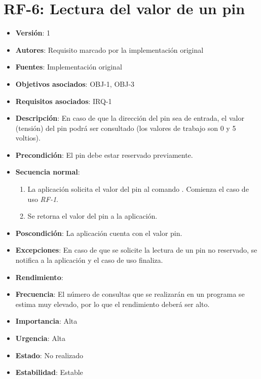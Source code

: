 \documentclass[letterpaper,10pt,spanish]{sphinxmanual}
\begin{document}
\section{RF-6: Lectura del valor de un pin}
\label{analysis/fr:rf-6-lectura-del-valor-de-un-pin}\begin{itemize}
\item {} 
\textbf{Versión}: 1

\item {} 
\textbf{Autores}: Requisito marcado por la implementación original

\item {} 
\textbf{Fuentes}: Implementación original

\item {} 
\textbf{Objetivos asociados}: OBJ-1, OBJ-3

\item {} 
\textbf{Requisitos asociados}: IRQ-1

\item {} 
\textbf{Descripción}: En caso de que la dirección del pin sea de entrada, el valor (tensión) del pin podrá ser consultado (los valores de trabajo son 0 y 5 voltios).

\item {} 
\textbf{Precondición}: El pin debe estar reservado previamente.

\item {} 
\textbf{Secuencia normal}:
\begin{enumerate}
\item {} 
La aplicación solicita el valor del pin al comando . Comienza el caso de uso \emph{RF-1}.

\item {} 
Se retorna el valor del pin a la aplicación.

\end{enumerate}

\item {} 
\textbf{Poscondición}: La aplicación cuenta con el valor pin.

\item {} 
\textbf{Excepciones}: En caso de que se solicite la lectura de un pin no reservado, se notifica a la aplicación y el caso de uso finaliza.

\item {} 
\textbf{Rendimiento}:

\item {} 
\textbf{Frecuencia}: El número de consultas que se realizarán en un programa se estima muy elevado, por lo que el rendimiento deberá ser alto.

\item {} 
\textbf{Importancia}: Alta

\item {} 
\textbf{Urgencia}: Alta

\item {} 
\textbf{Estado}: No realizado

\item {} 
\textbf{Estabilidad}: Estable

\end{itemize}
\end{document}
